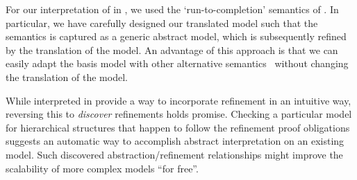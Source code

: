 For our interpretation of \statecharts in \mbox{\iUMLB}, we used the `run-to-completion' semantics of \statecharts.  In particular, we have carefully designed our translated model such that the semantics is captured as a generic abstract model, which is subsequently refined by the translation of the \SCXML model.  An advantage of this approach is that we can easily adapt the basis model with other alternative semantics~\mbox{\cite{Eshuis_2009}} without changing the translation of the \SCXML model. 

While \statecharts interpreted in \iUMLB provide a way to incorporate refinement in an intuitive way, reversing this to \emph{discover} refinements holds promise. 
Checking a particular \statechart model for hierarchical structures that happen to follow the refinement proof obligations suggests an automatic way to accomplish abstract interpretation on an existing model.  
Such discovered abstraction/refinement relationships might improve the scalability of more complex \statechart models ``for free''.
